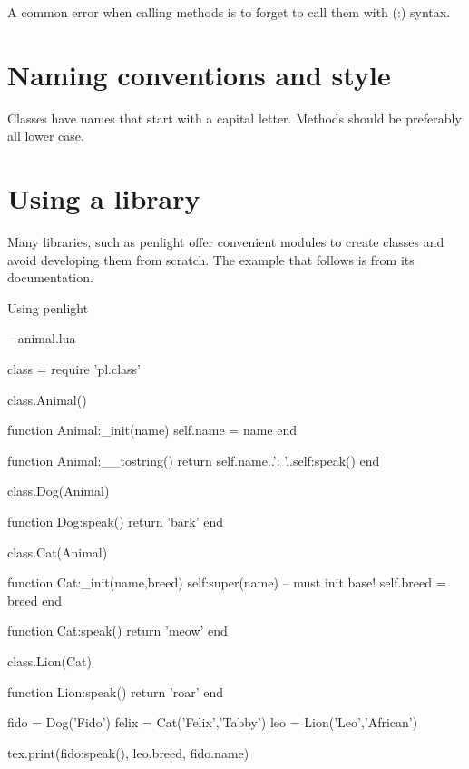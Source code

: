 A common error when calling  methods is to forget to call them with (:) syntax. 

\section{Naming conventions and style}

Classes have names that start with a capital letter. Methods should be preferably all lower case. 

\section{Using a library}

Many libraries, such as penlight offer convenient modules to create classes and avoid developing them from scratch. The example that follows is from its documentation.

\begin{texexample}{Using penlight}{}
\begin{luacode}

-- animal.lua

class = require 'pl.class'


class.Animal()

function Animal:_init(name)
    self.name = name
end

function Animal:__tostring()
  return self.name..': '..self:speak()
end

class.Dog(Animal)

function Dog:speak()
  return 'bark'
end

class.Cat(Animal)

function Cat:_init(name,breed)
    self:super(name)  -- must init base!
    self.breed = breed
end

function Cat:speak()
  return 'meow'
end

class.Lion(Cat)

function Lion:speak()
  return 'roar'
end

fido = Dog('Fido')
felix = Cat('Felix','Tabby')
leo = Lion('Leo','African')

tex.print(fido:speak(), leo.breed, fido.name)
\end{luacode}
\end{texexample}









